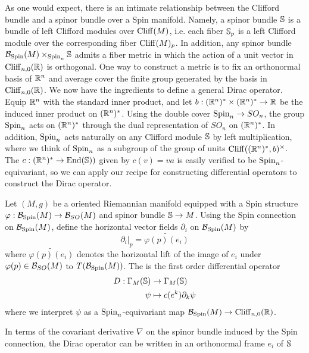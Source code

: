 As one would expect, there is an intimate relationship between the Clifford bundle
and a spinor bundle over a Spin manifold. Namely, a spinor bundle $\S$ is a
bundle of left Clifford modules over $\Cliff(M)$, i.e. each fiber $\S_p$ is a left
Clifford module over the corresponding fiber $\Cliff(M)_p$.
In addition, any spinor bundle $\B_{\Spin}(M) \times_{\Spin_n}\S$ admits a fiber metric
in which the action of a unit vector in $\Cliff_{n,0}(\R)$ is orthogonal. One way
to construct a metric is to fix an orthonormal basis of $\R^n$ and average
cover the finite group generated by the basis in $\Cliff_{n,0}(\R)$. We now have the
ingredients to define a general Dirac operator. \\
%

Equip $\R^n$ with the standard inner product, and let
$b :(\R^n)^* \times (\R^n)^* \to \R$ be the induced inner product on $(\R^n)^*$.
Using the double cover $\Spin_n \to SO_n$, the group $\Spin_n$ acts on
$(\R^n)^*$ through the dual representation of $SO_n$ on $(\R^n)^*$. In addition,
$\Spin_n$ acts naturally on any Clifford module $\S$ by left multiplication, where
we think of $\Spin_n$ as a subgroup of the group of units
$\Cliff((\R^n)^*, b)^\times$. The 
$c : (\R^n)^* \to \End(\S))$ given by $c(v) = va$ is easily
verified to be $\Spin_n$-equivariant, so we can apply our recipe for
constructing differential operators to construct the Dirac operator.
%
\begin{defn}
 Let $(M,g)$ be a oriented Riemannian manifold equipped with a Spin structure
 $\varphi : \B_{\Spin}(M) \to \B_{SO}(M)$ and spinor bundle $\S \to M$.
 Using the Spin connection on $\B_{\Spin}(M)$, define the horizontal
 vector fields $\partial_i$ on $\B_{\Spin}(M)$ by
 \[
  \partial_i\vert_p = \widetilde{\varphi(p)(e_i)}
 \]
 where $\widetilde{\varphi(p)(e_i)}$ denotes the horizontal lift of the
 image of $e_i$ under $\varphi(p) \in \B_{SO}(M)$ to $T(\B_{\Spin}(M))$.
 The  is the first order differential operator
 \begin{align*}
  D : \Gamma_M(\S) & \to \Gamma_M(\S)          \\
  \psi                & \mapsto c(e^k)\partial_k\psi
 \end{align*}
 where we interpret $\psi$ as a $\Spin_n$-equivariant map
 $\B_{\Spin}(M) \to \Cliff_{n,0}(\R)$.
\end{defn}
In terms of the covariant derivative $\nabla$ on the spinor bundle induced by the Spin
connection, the Dirac operator can be written in an orthonormal frame $e_i$ of $\S$
